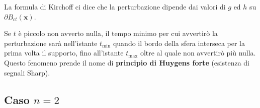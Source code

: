 \documentclass[10pt,a4paper,twoside,openright]{book}
\newcommand{\x}{\mathbf{x}}
\begin{document}
\begin{oss}
\begin{figure}[H]
    \end{figure}
    \FloatBarrier

    La formula di Kirchoff ci dice che la perturbazione dipende dai valori di $g$ ed $h$ su $\displaystyle \partial B_{ct}(\x)$.

    Se $t$ è piccolo non avverto nulla, il tempo minimo per cui avvertirò la perturbazione sarà nell'istante $\displaystyle t_{\min}$ quando il bordo della sfera interseca per la prima volta il supporto, fino all'istante $\displaystyle t_{\max}$ oltre al quale non avvertirò più nulla. Questo fenomeno prende il nome di \textbf{principio di Huygens forte }(esistenza di segnali Sharp).
\end{oss}

\subsection{Caso \texorpdfstring{$n=2$}{n=2}}
\end{document}
